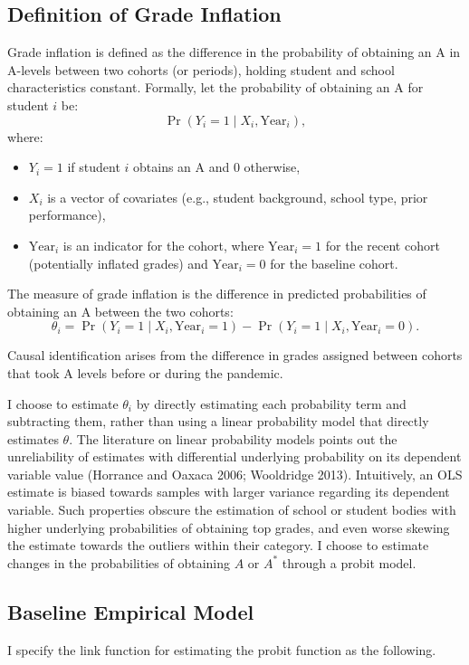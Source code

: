 \subsection*{Definition of Grade Inflation}

Grade inflation is defined as the difference in the probability of obtaining an A in A-levels between two cohorts (or periods), holding student and school characteristics constant. Formally, let the probability of obtaining an A for student $i$ be:
\[
\Pr(Y_i = 1 \mid X_i, \text{Year}_i),
\]
where:
\begin{itemize}
  \item $Y_i = 1$ if student $i$ obtains an A and $0$ otherwise,
  \item $X_i$ is a vector of covariates (e.g., student background, school type, prior performance),
  \item $\text{Year}_i$ is an indicator for the cohort, where $\text{Year}_i = 1$ for the recent cohort (potentially inflated grades) and $\text{Year}_i = 0$ for the baseline cohort.
\end{itemize}

The measure of grade inflation is the difference in predicted probabilities of obtaining an A between the two cohorts:
\begin{equation}
\theta_{i} = \Pr(Y_i = 1 \mid X_i, \text{Year}_i = 1) - \Pr(Y_i = 1 \mid X_i, \text{Year}_i = 0).
\label{eq:inflation_def}
\end{equation}

Causal identification arises from the difference in grades assigned between cohorts that took A levels before or during the pandemic. 

I choose to estimate $\theta_{i}$ by directly estimating each probability term and subtracting them, rather than using a linear probability model that directly estimates $\theta$. The literature on linear probability models points out the unreliability of estimates with differential underlying probability on its dependent variable value (Horrance and Oaxaca 2006; Wooldridge 2013). Intuitively, an OLS estimate is biased towards samples with larger variance regarding its dependent variable. Such properties obscure the estimation of school or student bodies with higher underlying probabilities of obtaining top grades, and even worse skewing the estimate towards the outliers within their category. I choose to estimate changes in the probabilities of obtaining $A$ or $A^*$ through a probit model.

\subsection{Baseline Empirical Model}
I specify the link function for estimating the probit function as the following.
\setlength{\abovedisplayskip}{0.2cm}
\setlength{\belowdisplayskip}{0.2cm}

